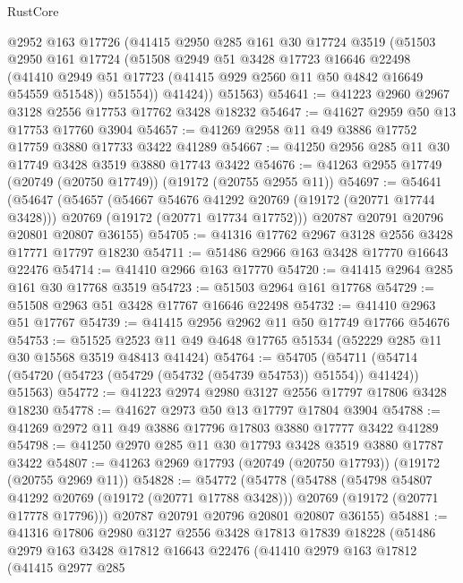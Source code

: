 \begin{lexlean}{RustCore}
\begin{coremodule}
        @2952
        @163
        @17726
        (@41415
          @2950
          @285
          @161
          @30
          @17724
          @3519
          (@51503
            @2950
            @161
            @17724
            (@51508
              @2949
              @51
              @3428
              @17723
              @16646
              @22498
              (@41410 @2949 @51 @17723 (@41415 @929 @2560 @11 @50 @4842 @16649 @54559 @51548))
              @51554))
          @41424))
      @51563)
@54641 := @41223 @2960 @2967 @3128 @2556 @17753 @17762 @3428 @18232
@54647 := @41627 @2959 @50 @13 @17753 @17760 @3904
@54657 := @41269 @2958 @11 @49 @3886 @17752 @17759 @3880 @17733 @3422 @41289
@54667 := @41250 @2956 @285 @11 @30 @17749 @3428 @3519 @3880 @17743 @3422
@54676 := @41263 @2955 @17749 (@20749 (@20750 @17749)) (@19172 (@20755 @2955 @11))
@54697 := @54641
    (@54647
      (@54657
        (@54667 @54676 @41292 @20769 (@19172 (@20771 @17744 @3428)))
        @20769
        (@19172 (@20771 @17734 @17752)))
      @20787
      @20791
      @20796
      @20801
      @20807
      @36155)
@54705 := @41316 @17762 @2967 @3128 @2556 @3428 @17771 @17797 @18230
@54711 := @51486 @2966 @163 @3428 @17770 @16643 @22476
@54714 := @41410 @2966 @163 @17770
@54720 := @41415 @2964 @285 @161 @30 @17768 @3519
@54723 := @51503 @2964 @161 @17768
@54729 := @51508 @2963 @51 @3428 @17767 @16646 @22498
@54732 := @41410 @2963 @51 @17767
@54739 := @41415 @2956 @2962 @11 @50 @17749 @17766 @54676
@54753 := @51525 @2523 @11 @49 @4648 @17765 @51534 (@52229 @285 @11 @30 @15568 @3519 @48413 @41424)
@54764 := @54705
    (@54711 (@54714 (@54720 (@54723 (@54729 (@54732 (@54739 @54753)) @51554)) @41424)) @51563)
@54772 := @41223 @2974 @2980 @3127 @2556 @17797 @17806 @3428 @18230
@54778 := @41627 @2973 @50 @13 @17797 @17804 @3904
@54788 := @41269 @2972 @11 @49 @3886 @17796 @17803 @3880 @17777 @3422 @41289
@54798 := @41250 @2970 @285 @11 @30 @17793 @3428 @3519 @3880 @17787 @3422
@54807 := @41263 @2969 @17793 (@20749 (@20750 @17793)) (@19172 (@20755 @2969 @11))
@54828 := @54772
    (@54778
      (@54788
        (@54798 @54807 @41292 @20769 (@19172 (@20771 @17788 @3428)))
        @20769
        (@19172 (@20771 @17778 @17796)))
      @20787
      @20791
      @20796
      @20801
      @20807
      @36155)
@54881 := @41316
    @17806
    @2980
    @3127
    @2556
    @3428
    @17813
    @17839
    @18228
    (@51486
      @2979
      @163
      @3428
      @17812
      @16643
      @22476
      (@41410
        @2979
        @163
        @17812
        (@41415
          @2977
          @285

\end{coremodule}
\end{lexlean}
